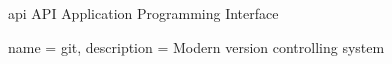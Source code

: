 \newacronym
  {api}
  {API}
  {Application Programming Interface}

{
  name = git,
  description = {
    Modern version controlling system
  }
}


